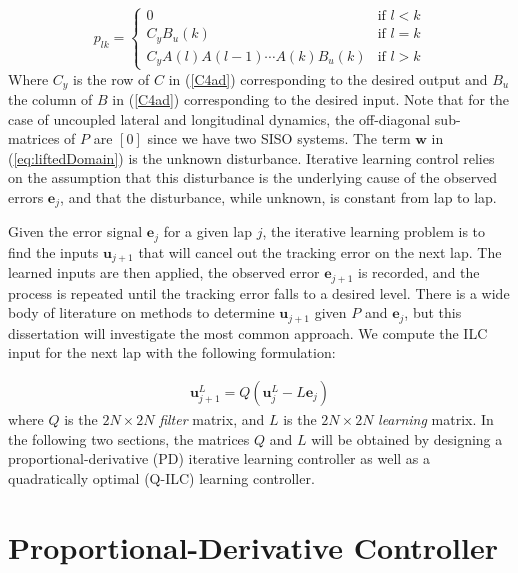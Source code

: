 \begin{equation}
\label{eq:how2Lift}
p_{lk} = \begin{cases} 0 &\mbox{if } l < k \\ 
C_yB_u(k) & \mbox{if } l = k \\
C_yA(l)A(l-1)\cdots A(k)B_u(k) &\mbox{if } l > k \end{cases}
\end{equation} 
Where $C_y$ is the row of $C$ in (\ref{C4ad}) corresponding to the desired output and $B_u$ the column of $B$ in (\ref{C4ad})
corresponding to the desired input. Note that
for the case of uncoupled lateral and longitudinal dynamics, the off-diagonal sub-matrices of $P$ are $[0]$ since we have
two SISO systems. The term $\mathbf{w}$ in (\ref{eq:liftedDomain}) is the unknown disturbance. Iterative
learning control relies on the assumption that this disturbance is the underlying cause of the observed errors $\mathbf{e}_j$, and that 
the disturbance, while unknown, is constant from lap to lap.

Given the error signal $\mathbf{e}_j$ for a given lap $j$, the iterative learning problem is to find the inputs $\mathbf{u}_{j+1}$ that
will cancel out the tracking error on the next lap. The learned inputs are then applied, the observed error $\mathbf{e}_{j+1}$ is recorded,
and the process is repeated until the tracking error falls to a desired level. There is a wide body of literature on methods to determine $\mathbf{u}_{j+1}$ given $P$ and $\mathbf{e}_j$, but this dissertation will
investigate the most common approach. We compute the ILC input for the next lap with the following formulation:

\begin{align}
 \label{eqn:ctrlLaw}
 \mathbf{u}^L_{j\!+\!1} = Q(\mathbf{u}^L_j - L\mathbf{e}_j)
\end{align}
where $Q$ is the $2N \times 2N$ \textit{filter} matrix, and $L$ is the $2N \times 2N$ \textit{learning} matrix. 
In the following two sections, the
matrices $Q$ and $L$ will be obtained by designing a proportional-derivative (PD) iterative learning controller as well as a quadratically
optimal (Q-ILC) learning controller.

\newpage
\section{Proportional-Derivative Controller}
\label{sec:pdcontroller}

